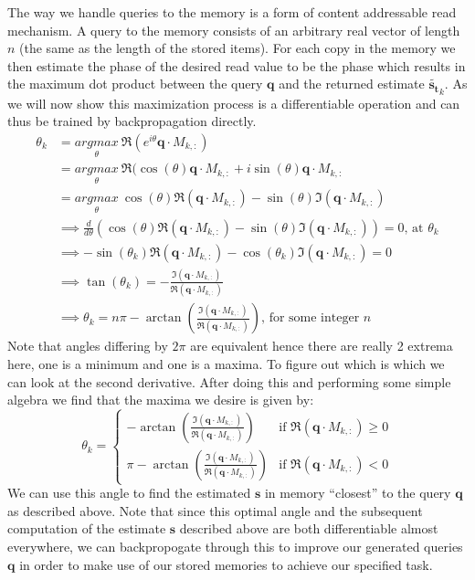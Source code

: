 \documentclass{article}
\begin{document}
The way we handle queries to the memory is a form of content addressable read mechanism. A query to the memory consists of an arbitrary real vector of length $n$ (the same as the length of the stored items). For each copy in the memory we then estimate the phase of the desired read value to be the phase which results in the maximum dot product between the query $\pmb{q}$ and the returned estimate $\tilde{\pmb{s_t}}_{k}$. As we will now show this maximization process is a differentiable operation and can thus be trained by backpropagation directly.
\begin{align*}
\theta_k&=\underset{\theta}{argmax}\  \Re(e^{i\theta}\pmb{q}\cdot M_{k,:})\\
&=\underset{\theta}{argmax}\  \Re(\cos(\theta)\pmb{q}\cdot M_{k,:}+i\sin(\theta)\pmb{q}\cdot M_{k,:}\\
&=\underset{\theta}{argmax}\  \cos(\theta)\Re(\pmb{q}\cdot M_{k,:})-\sin(\theta)\Im(\pmb{q}\cdot M_{k,:})\\
&\implies \frac{d}{d\theta}\left(\cos(\theta)\Re(\pmb{q}\cdot M_{k,:})-\sin(\theta)\Im(\pmb{q}\cdot M_{k,:})\right)=0\text{, at }\theta_k\\
&\implies -\sin(\theta_k)\Re(\pmb{q}\cdot M_{k,:})-\cos(\theta_k)\Im(\pmb{q}\cdot M_{k,:})=0\\
&\implies \tan(\theta_k)=-\frac{\Im(\pmb{q}\cdot M_{k,:})}{\Re(\pmb{q}\cdot M_{k,:})}\\
&\implies \theta_k=n\pi-\arctan\left(\frac{\Im(\pmb{q}\cdot M_{k,:})}{\Re(\pmb{q}\cdot M_{k,:})}\right)\text{, for some integer }n
\end{align*}
Note that angles differing by $2\pi$ are equivalent hence there are really 2 extrema here, one is a minimum and one is a maxima. To figure out which is which we can look at the second derivative. After doing this and performing some simple algebra we find that the maxima we desire is given by:
$$\theta_k = \begin{cases}
 -\arctan\left(\frac{\Im(\pmb{q}\cdot M_{k,:})}{\Re(\pmb{q}\cdot M_{k,:})}\right) &\text{if $\Re(\pmb{q}\cdot M_{k,:})\geq0$}\\    \pi-\arctan\left(\frac{\Im(\pmb{q}\cdot M_{k,:})}{\Re(\pmb{q}\cdot M_{k,:})}\right) &\text{if $\Re(\pmb{q}\cdot M_{k,:})<0$}
\end{cases}
$$
We can use this angle to find the estimated $\pmb{s}$ in memory ``closest'' to the query $\pmb{q}$ as described above. Note that since this optimal angle and the subsequent computation of the estimate $\pmb{s}$ described above are both differentiable almost everywhere, we can backpropogate through this to improve our generated queries $\pmb{q}$ in order to make use of our stored memories to achieve our specified task.
\end{document}

